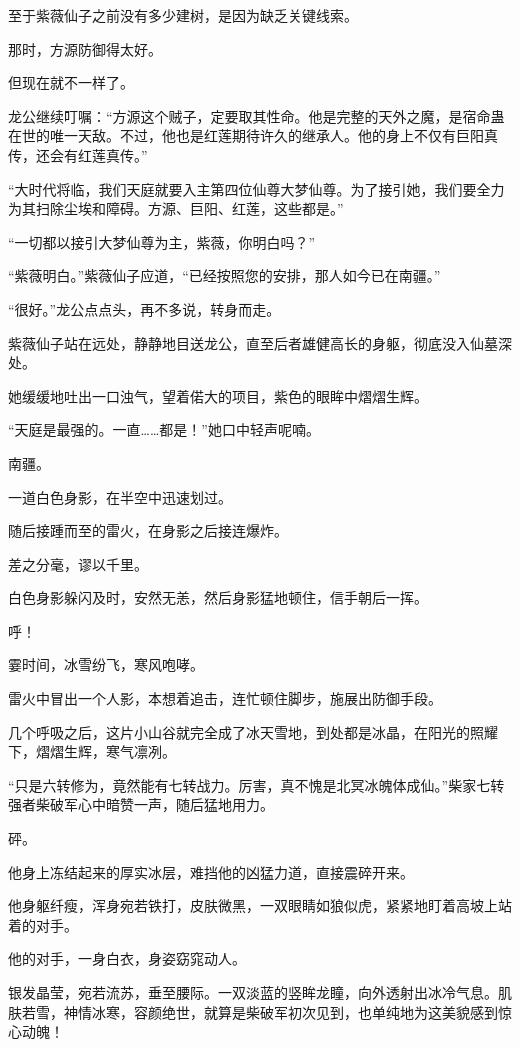 \begin{this_body}
至于紫薇仙子之前没有多少建树，是因为缺乏关键线索。

那时，方源防御得太好。

但现在就不一样了。

龙公继续叮嘱：“方源这个贼子，定要取其性命。他是完整的天外之魔，是宿命蛊在世的唯一天敌。不过，他也是红莲期待许久的继承人。他的身上不仅有巨阳真传，还会有红莲真传。”

“大时代将临，我们天庭就要入主第四位仙尊大梦仙尊。为了接引她，我们要全力为其扫除尘埃和障碍。方源、巨阳、红莲，这些都是。”

“一切都以接引大梦仙尊为主，紫薇，你明白吗？”

“紫薇明白。”紫薇仙子应道，“已经按照您的安排，那人如今已在南疆。”

“很好。”龙公点点头，再不多说，转身而走。

紫薇仙子站在远处，静静地目送龙公，直至后者雄健高长的身躯，彻底没入仙墓深处。

她缓缓地吐出一口浊气，望着偌大的项目，紫色的眼眸中熠熠生辉。

“天庭是最强的。一直……都是！”她口中轻声呢喃。

南疆。

一道白色身影，在半空中迅速划过。

随后接踵而至的雷火，在身影之后接连爆炸。

差之分毫，谬以千里。

白色身影躲闪及时，安然无恙，然后身影猛地顿住，信手朝后一挥。

呼！

霎时间，冰雪纷飞，寒风咆哮。

雷火中冒出一个人影，本想着追击，连忙顿住脚步，施展出防御手段。

几个呼吸之后，这片小山谷就完全成了冰天雪地，到处都是冰晶，在阳光的照耀下，熠熠生辉，寒气凛冽。

“只是六转修为，竟然能有七转战力。厉害，真不愧是北冥冰魄体成仙。”柴家七转强者柴破军心中暗赞一声，随后猛地用力。

砰。

他身上冻结起来的厚实冰层，难挡他的凶猛力道，直接震碎开来。

他身躯纤瘦，浑身宛若铁打，皮肤微黑，一双眼睛如狼似虎，紧紧地盯着高坡上站着的对手。

他的对手，一身白衣，身姿窈窕动人。

银发晶莹，宛若流苏，垂至腰际。一双淡蓝的竖眸龙瞳，向外透射出冰冷气息。肌肤若雪，神情冰寒，容颜绝世，就算是柴破军初次见到，也单纯地为这美貌感到惊心动魄！


\end{this_body}
